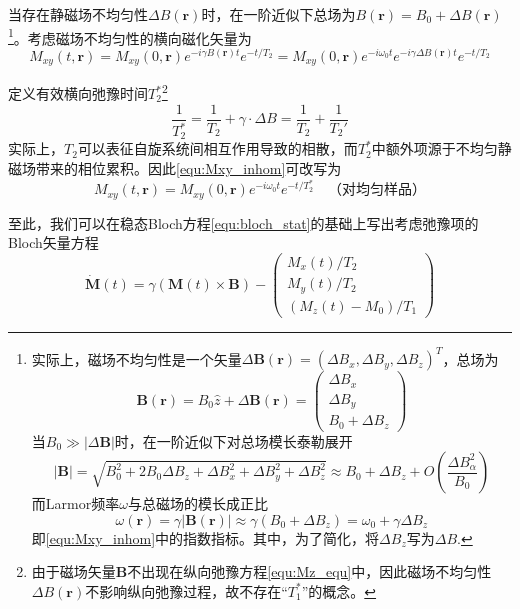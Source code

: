\documentclass[12pt]{article}
\begin{document}
当存在静磁场不均匀性$\Delta B(\bm{r})$时，在一阶近似下总场为$B(\mathbf{r})=B_0+\Delta B(\mathbf{r})$\footnote{实际上，磁场不均匀性是一个矢量$\Delta\bm{B}(\bm{r})=(\Delta B_x,\Delta B_y,\Delta B_z)^T$，总场为
\begin{equation}
    \bm{B}(\bm{r})=B_0\hat{z}+\Delta\bm{B}(\bm{r})=
    \begin{pmatrix} \Delta B_x \\ \Delta B_y \\ B_0+\Delta B_z \end{pmatrix}
\end{equation}
当$B_0\gg|\Delta\bm{B}|$时，在一阶近似下对总场模长泰勒展开
\begin{equation}
    |\bm{B}|=\sqrt{B_0^2+2B_0\Delta B_z+\Delta B_x^2+\Delta B_y^2+\Delta B_z^2}\approx B_0+\Delta B_z+O\left(\frac{\Delta B_\alpha^2}{B_0}\right)
\end{equation}
而Larmor频率$\omega$与总磁场的模长成正比
\begin{equation}
    \omega(\bm{r})=\gamma|\bm{B}(\bm{r})|\approx\gamma(B_0+\Delta B_z)=\omega_0+\gamma\Delta B_z
\end{equation}
即\autoref{equ:Mxy_inhom}中的指数指标。其中，为了简化，将$\Delta B_z$写为$\Delta B$.
}。考虑磁场不均匀性的横向磁化矢量为
\begin{equation}
    M_{xy}(t,\bm{r})=M_{xy}(0,\bm{r})e^{-i\gamma B(\bm{r})t}e^{-t/T_2}=M_{xy}(0,\bm{r})e^{-i\omega_0t}e^{-i\gamma\Delta B(\bm{r})t}e^{-t/T_2}
    \label{equ:Mxy_inhom}
\end{equation}

定义有效横向弛豫时间$T_2^*$\footnote{由于磁场矢量$\bm{B}$不出现在纵向弛豫方程\autoref{equ:Mz_equ}中，因此磁场不均匀性$\Delta B(\bm{r})$不影响纵向弛豫过程，故不存在“$T_1^*$”的概念。}
\begin{equation}
    \frac{1}{T_2^*}=\frac{1}{T_2}+\gamma\cdot\Delta B=\frac{1}{T_2}+\frac{1}{T_2'}
\end{equation}
实际上，$T_2$可以表征自旋系统间相互作用导致的相散，而$T_2^*$中额外项源于不均匀静磁场带来的相位累积。因此\autoref{equ:Mxy_inhom}可改写为
\begin{equation}
    M_{xy}(t,\bm{r})=M_{xy}(0,\bm{r})e^{-i\omega_0t}e^{-t/T_2^*}\quad\text{（对均匀样品）}
\end{equation}

至此，我们可以在稳态Bloch方程\autoref{equ:bloch_stat}的基础上写出考虑弛豫项的Bloch矢量方程
\begin{equation}
    \boxed{\dot{\bm{M}}(t)=\gamma(\bm{M}(t)\times\bm{B})-\begin{pmatrix} M_x(t)/T_2 \\ M_y(t)/T_2 \\ (M_z(t)-M_0)/T_1 \end{pmatrix}}
\end{equation}
\end{document}
